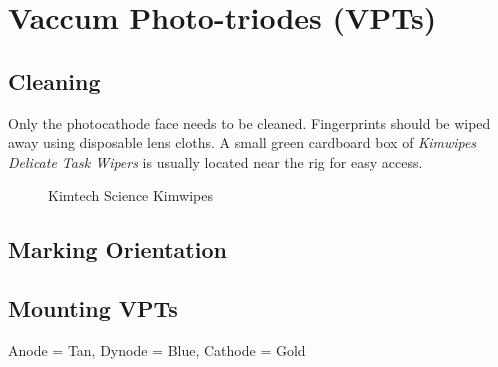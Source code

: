 \chapter{Vaccum Photo-triodes (VPTs)}
\label{sec:op_vpt}

\section{Cleaning}
\label{sec:op_vpt:cleaning}

Only the photocathode face needs to be cleaned.  Fingerprints should be wiped away using disposable lens cloths.  A small green cardboard box of \textit{Kimwipes Delicate Task Wipers} is usually located near the rig for easy access.

\begin{figure}[hbtp]
  \centering
  \caption{Kimtech Science Kimwipes}
  \label{fig:op_vpt:cleaning:kimwipes}
\end{figure}


\section{Marking Orientation}
\label{sec:op_vpt:orienting}

\section{Mounting VPTs}
\label{sec:op_vpt:mounting}

Anode = Tan, Dynode = Blue, Cathode = Gold



